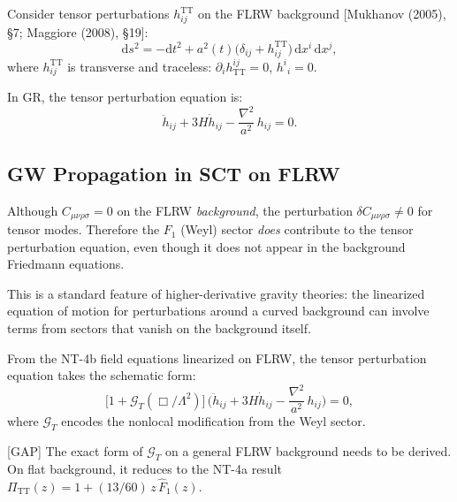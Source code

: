 \documentclass[12pt,a4paper]{article}
\theoremstyle{definition}
\theoremstyle{remark}
\newcommand{\dd}{\mathrm{d}}
\newcommand{\fromlit}[1]{\textcolor{blue!70!black}{\textsf{[#1]}}}
\newcommand{\gap}{\textcolor{red!80!black}{\textsf{[GAP]}}}
\begin{document}
Consider tensor perturbations $h_{ij}^{\mathrm{TT}}$ on the FLRW
background \fromlit{Mukhanov (2005), \S7; Maggiore (2008), \S19}:
\begin{equation}\label{eq:metric-tensor-pert}
  \dd s^2 = -\dd t^2 + a^2(t)\bigl(\delta_{ij}
  + h_{ij}^{\mathrm{TT}}\bigr)\,\dd x^i\,\dd x^j,
\end{equation}
where $h_{ij}^{\mathrm{TT}}$ is transverse and traceless:
$\partial_i h^{ij}_{\mathrm{TT}} = 0$, $h^i{}_i = 0$.

In GR, the tensor perturbation equation is:
\begin{equation}\label{eq:gw-GR}
  \ddot{h}_{ij} + 3H\dot{h}_{ij} - \frac{\nabla^2}{a^2}\,h_{ij} = 0.
\end{equation}

\subsection{GW Propagation in SCT on FLRW}

\begin{tcolorbox}[colback=yellow!5!white, colframe=orange!60!black,
  title={\textbf{Critical: The Weyl Sector Contributes to
  Perturbations}}]
Although $C_{\mu\nu\rho\sigma} = 0$ on the FLRW \emph{background},
the perturbation $\delta C_{\mu\nu\rho\sigma} \neq 0$ for tensor
modes. Therefore the $F_1$ (Weyl) sector \emph{does} contribute to
the tensor perturbation equation, even though it does not appear in
the background Friedmann equations.

This is a standard feature of higher-derivative gravity theories:
the linearized equation of motion for perturbations around a curved
background can involve terms from sectors that vanish on the
background itself.
\end{tcolorbox}

From the NT-4b field equations linearized on FLRW, the tensor
perturbation equation takes the schematic form:
\begin{equation}\label{eq:gw-sct}
  \bigl[1 + \mathcal{G}_T(\Box/\Lambda^2)\bigr]\,
  \bigl(\ddot{h}_{ij} + 3H\dot{h}_{ij}
  - \frac{\nabla^2}{a^2}\,h_{ij}\bigr) = 0,
\end{equation}
where $\mathcal{G}_T$ encodes the nonlocal modification from
the Weyl sector.

\gap{} The exact form of $\mathcal{G}_T$ on a general FLRW
background needs to be derived. On flat background, it reduces to
the NT-4a result $\Pi_{\mathrm{TT}}(z) = 1 + (13/60)\,z\,\hat{F}_1(z)$.
\end{document}

